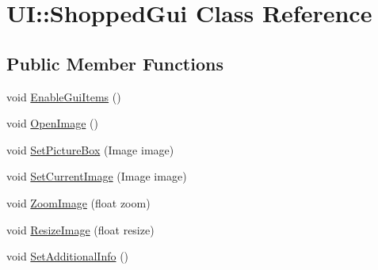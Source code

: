 \hypertarget{class_u_i_1_1_shopped_gui}{
\section{UI::ShoppedGui Class Reference}
\label{class_u_i_1_1_shopped_gui}
}
\subsection*{Public Member Functions}
\begin{DoxyCompactItemize}
\item 
void \hyperlink{class_u_i_1_1_shopped_gui_a190bba777e57891c8042b86afbba83c6}{EnableGuiItems} ()
\item 
void \hyperlink{class_u_i_1_1_shopped_gui_a3a27f074b7b204b1df148921a0dcc20c}{OpenImage} ()
\item 
void \hyperlink{class_u_i_1_1_shopped_gui_a61ba32572b328bdc7f6e835eff9eb946}{SetPictureBox} (Image image)
\item 
void \hyperlink{class_u_i_1_1_shopped_gui_ae6c209174dca46445f9e83ba41180a62}{SetCurrentImage} (Image image)
\item 
void \hyperlink{class_u_i_1_1_shopped_gui_ad0f2c5e2eb63419a49622ab3faa2d347}{ZoomImage} (float zoom)
\item 
void \hyperlink{class_u_i_1_1_shopped_gui_af17943aa92b2c904e67d2e73dc355fdd}{ResizeImage} (float resize)
\item 
void \hyperlink{class_u_i_1_1_shopped_gui_a292a827437d7f2098c13bc1a735a569e}{SetAdditionalInfo} ()
\end{DoxyCompactItemize}
